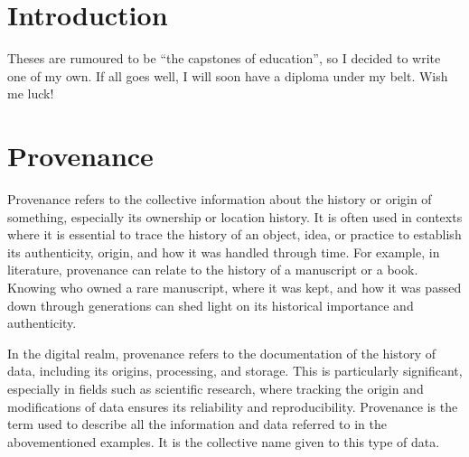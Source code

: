 \documentclass[
  digital,     %
  oneside,     %
  nosansbold,  %
  nocolorbold, %
  lof,         %
  lot,         %
]{fithesis4}
\begin{document}
\chapter*{Introduction}

Theses are rumoured to be \enquote{the capstones of education}, so
I decided to write one of my own. If all goes well, I will soon
have a diploma under my belt. Wish me luck!


\chapter{Provenance}
\shorthandoff{-}
Provenance refers to the collective information about the history or origin of something, especially its ownership or location history. It is often used in contexts where it is essential to trace the history of an object, idea, or practice to establish its authenticity, origin, and how it was handled through time. For example, in literature, provenance can relate to the history of a manuscript or a book. Knowing who owned a rare manuscript, where it was kept, and how it was passed down through generations can shed light on its historical importance and authenticity.

In the digital realm, provenance refers to the documentation of the history of data, including its origins, processing, and storage. This is particularly significant, especially in fields such as scientific research, where tracking the origin and modifications of data ensures its reliability and reproducibility. Provenance is the term used to describe all the information and data referred to in the abovementioned examples. It is the collective name given to this type of data.
\shorthandon{-}
\end{document}
